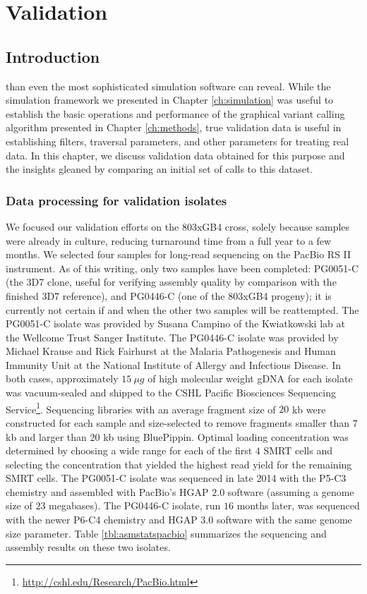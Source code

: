 \chapter{Validation}
\label{ch:realdata}

\section{Introduction}

 than even the most sophisticated simulation software can reveal.  While the simulation framework we presented in Chapter \ref{ch:simulation} was useful to establish the basic operations and performance of the graphical variant calling algorithm presented in Chapter \ref{ch:methods}, true validation data is useful in establishing filters, traversal parameters, and other parameters for treating real data.  In this chapter, we discuss validation data obtained for this purpose and the insights gleaned by comparing an initial set of calls to this dataset.

\subsection{Data processing for validation isolates}

We focused our validation efforts on the 803xGB4 cross, solely because samples were already in culture, reducing turnaround time from a full year to a few months.  We selected four samples for long-read sequencing on the PacBio RS II instrument.  As of this writing, only two samples have been completed: PG0051-C (the 3D7 clone, useful for verifying assembly quality by comparison with the finished 3D7 reference), and PG0446-C (one of the 803xGB4 progeny); it is currently not certain if and when the other two samples will be reattempted.  The PG0051-C isolate was provided by Susana Campino of the Kwiatkowski lab at the Wellcome Trust Sanger Institute.  The PG0446-C isolate was provided by Michael Krause and Rick Fairhurst at the Malaria Pathogenesis and Human Immunity Unit at the National Institute of Allergy and Infectious Disease.  In both cases, approximately $15~{\mu}g$ of high molecular weight gDNA for each isolate was vacuum-sealed and shipped to the CSHL Pacific Biosciences Sequencing Service\footnote{\url{http://cshl.edu/Research/PacBio.html}}.  Sequencing libraries with an average fragment size of $20$ kb were constructed for each sample and size-selected to remove fragments smaller than $7$ kb and larger than $20$ kb using BluePippin.  Optimal loading concentration was determined by choosing a wide range for each of the first $4$ SMRT cells and selecting the concentration that yielded the highest read yield for the remaining SMRT cells.  The PG0051-C isolate was sequenced in late 2014 with the P5-C3 chemistry and assembled with PacBio's HGAP $2.0$ software (assuming a genome size of $23$ megabases).  The PG0446-C isolate, run $16$ months later, was sequenced with the newer P6-C4 chemistry and HGAP $3.0$ software with the same genome size parameter.  Table \ref{tbl:asmstatspacbio} summarizes the sequencing and assembly results on these two isolates.

